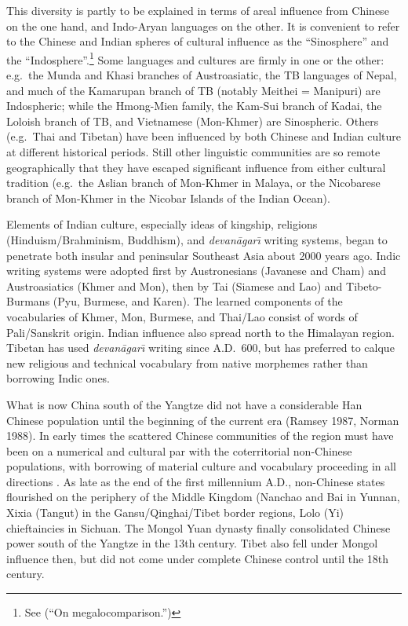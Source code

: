 This diversity is partly to be explained in terms of areal influence from Chinese on the one hand, and Indo-Aryan languages on the other. It is convenient to refer to the Chinese and Indian spheres of cultural influence as the “Sinosphere” and the “Indosphere”.\footnote{See \citealt{JAM-OM} (“On megalocomparison.”)} Some languages and cultures are firmly in one or the other: e.g.\ the Munda and Khasi branches of Austroasiatic, the TB languages of Nepal, and much of the Kamarupan branch of TB (notably Meithei = Manipuri) are Indospheric; while the Hmong-Mien family, the Kam-Sui branch of Kadai, the Loloish branch of TB, and Vietnamese (Mon-Khmer) are Sinospheric. Others (e.g.\ Thai and Tibetan) have been influenced by both Chinese and Indian culture at different historical periods. Still other linguistic communities are so remote geographically that they have escaped significant influence from either cultural tradition (e.g.\ the Aslian branch of Mon-Khmer in Malaya, or the Nicobarese branch of Mon-Khmer in the Nicobar Islands of the Indian Ocean).

Elements of Indian culture, especially ideas of kingship, religions (Hinduism/Brahminism, Buddhism), and {\it devan\=agar\={\i}} writing systems, began to penetrate both insular and peninsular Southeast Asia about 2000 years ago. Indic writing systems were adopted first by Austronesians (Javanese and Cham) and Austroasiatics (Khmer and Mon), then by Tai (Siamese and Lao) and Tibeto-Burmans (Pyu, Burmese, and Karen). The learned components of the vocabularies of Khmer, Mon, Burmese, and Thai/Lao consist of words of Pali/Sanskrit origin. Indian influence also spread north to the Himalayan region. Tibetan has used {\it devan\=agar\={\i}} writing since A.D.\ 600, but has preferred to calque new religious and technical vocabulary from native morphemes rather than borrowing Indic ones.

What is now China south of the Yangtze did not have a considerable Han Chinese population until the beginning of the current era (Ramsey 1987, Norman 1988). In early times the scattered Chinese communities of the region must have been on a numerical and cultural par with the coterritorial non-Chinese populations, with borrowing of material culture and vocabulary proceeding in all directions \citep{PB-ATLC,MeiNorman1976,Sagart1990}. As late as the end of the first millennium A.D., non-Chinese states flourished on the periphery of the Middle Kingdom (Nanchao and Bai in Yunnan, Xixia (Tangut) in the Gansu/Qinghai/Tibet border regions, Lolo (Yi) chieftaincies in Sichuan. The Mongol Yuan dynasty finally consolidated Chinese power south of the Yangtze in the 13th century. Tibet also fell under Mongol influence then, but did not come under complete Chinese control until the 18th century.

